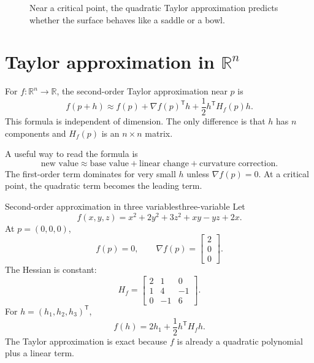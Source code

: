 \documentclass[11pt]{article}
\newcommand{\R}{\mathbb R}
\newcommand{\grad}{\nabla}
\newcommand{\T}{^{\mathsf T}}
\newcommand{\vect}[1]{\begin{bmatrix}#1\end{bmatrix}}
\begin{document}
\begin{figure}[H]
\centering
{}
\caption{Near a critical point, the quadratic Taylor approximation predicts whether the surface behaves like a saddle or a bowl.}
\end{figure}

\section{Taylor approximation in $\R^n$}

For $f:\R^n\to\R$, the second-order Taylor approximation near $p$ is
\[
f(p+h)\approx f(p)+\grad f(p)\T h+\frac12h\T H_f(p)h.
\]
This formula is independent of dimension. The only difference is that $h$ has $n$ components and $H_f(p)$ is an $n\times n$ matrix.

A useful way to read the formula is
\[
\text{new value}\approx \text{base value}+\text{linear change}+\text{curvature correction}.
\]
The first-order term dominates for very small $h$ unless $\grad f(p)=0$. At a critical point, the quadratic term becomes the leading term.

\begin{examplebox}{Second-order approximation in three variables}{three-variable}
Let
\[
f(x,y,z)=x^2+2y^2+3z^2+xy-yz+2x.
\]
At $p=(0,0,0)$,
\[
f(p)=0,
\qquad
\grad f(p)=\vect{2\\0\\0}.
\]
The Hessian is constant:
\[
H_f=\begin{bmatrix}2&1&0\\1&4&-1\\0&-1&6\end{bmatrix}.
\]
For $h=(h_1,h_2,h_3)\T$,
\[
f(h)=2h_1+\frac12h\T H_fh.
\]
The Taylor approximation is exact because $f$ is already a quadratic polynomial plus a linear term.
\end{examplebox}
\end{document}
